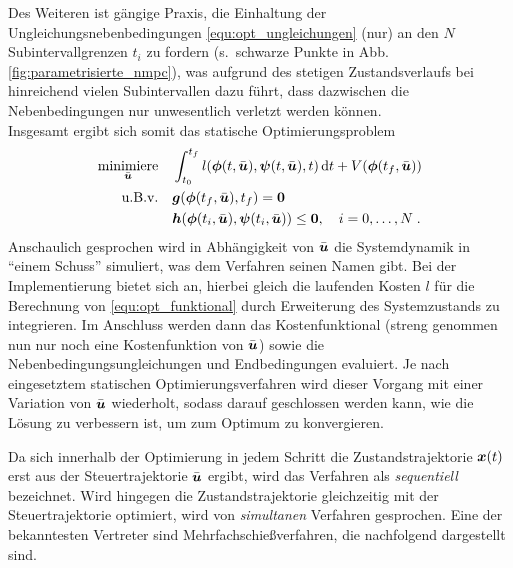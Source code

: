 Des Weiteren ist gängige Praxis, die Einhaltung der Ungleichungsnebenbedingungen \eqref{equ:opt_ungleichungen} (nur) an den $N$ Subintervallgrenzen $t_i$ zu fordern (s.\ schwarze Punkte in Abb.\,\ref{fig:parametrisierte_nmpc}), was aufgrund des stetigen Zustandsverlaufs bei hinreichend vielen Subintervallen dazu führt, dass dazwischen die Nebenbedingungen nur unwesentlich verletzt werden können. \\
Insgesamt ergibt sich somit das statische Optimierungsproblem \cite{papageorgiou2012optimierung, graichen2014SkriptOpt}
\begin{subequations}
\begin{align}
	\underset{\bar{\bs{u}}}{\text{minimiere}}  \quad & %
	\int_{t_0}^{t_f} l(\bs{\phi}(t,\bar{\bs{u}}),\bs{\psi}(t,\bar{\bs{u}}),t)\,{\rm d} t + V(\bs{\phi}(t_f,\bar{\bs{u}})) \\
	\text{u.B.v.} \quad &\bs{g}(\bs{\phi}(t_f,\bar{\bs{u}}),t_f) = \bs{0}\\ 	
	&\bs{h}(\bs{\phi}(t_i,\bar{\bs{u}}),\bs{\psi}(t_i,\bar{\bs{u}}))  \leq \bs{0},  \quad  i=0,\ldots,N \;. 
\end{align} 
\end{subequations}
Anschaulich gesprochen wird in Abhängigkeit von %
$\bar{\boldsymbol{u}}$ die Systemdynamik in "`einem Schuss"' simuliert, was dem Verfahren seinen Namen gibt. Bei der Implementierung bietet sich an, hierbei gleich die laufenden Kosten $l$ für die Berechnung von \eqref{equ:opt_funktional} durch Erweiterung des Systemzustands zu integrieren. Im Anschluss werden dann das Kostenfunktional (streng genommen nun nur noch eine Kostenfunktion von $\bar{\boldsymbol{u}}$) sowie die Nebenbedingungsungleichungen und Endbedingungen evaluiert. Je nach eingesetztem statischen Optimierungsverfahren wird dieser Vorgang mit einer Variation von $\bar{\boldsymbol{u}}$ wiederholt, sodass darauf geschlossen werden kann, wie die Lösung zu verbessern ist, um zum Optimum zu konvergieren.

Da sich innerhalb der Optimierung in jedem Schritt die Zustandstrajektorie $\boldsymbol{x}(t)$ erst aus der Steuertrajektorie $\bar{\boldsymbol{u}}$ ergibt, wird das Verfahren als \emph{sequentiell} bezeichnet. Wird hingegen die Zustandstrajektorie gleichzeitig mit der Steuertrajektorie optimiert, wird von \emph{simultanen} Verfahren gesprochen. Eine der bekanntesten Vertreter sind Mehrfachschießverfahren, die nachfolgend dargestellt sind.

